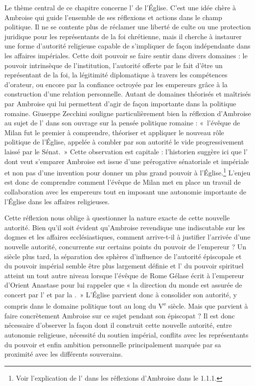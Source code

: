 Le thème central de ce chapitre concerne l' de l'Église. C'est une idée chère à Ambroise qui guide l'ensemble de ses réflexions et actions dans le champ politique. Il ne se contente plus de réclamer une liberté de culte ou une protection juridique pour les représentants de la foi chrétienne, mais il cherche à instaurer une forme d'autorité religieuse capable de s'impliquer de façon indépendante dans les affaires impériales. Cette  doit pouvoir se faire sentir dans divers domaines : le pouvoir intrinsèque de l'institution, l'autorité offerte par le fait d'être un représentant de la foi, la légitimité diplomatique à travers les compétences d'orateur, ou encore par la confiance octroyée par les empereurs grâce à la construction d'une relation personnelle. Autant de domaines théorisés et maîtrisés par Ambroise qui lui permettent d'agir de façon importante dans la politique romaine. Giuseppe Zecchini souligne particulièrement bien la réflexion d'Ambroise au sujet de l' dans son ouvrage sur la pensée politique romaine : «~l'évêque de Milan fut le premier à comprendre, théoriser et appliquer le nouveau rôle politique de l'Église, appelée à combler par son autorité le vide progressivement laissé par le Sénat.\autocite[165]{zecchini_pensiero_politico}~» Cette observation est capitale : l'historien suggère ici que l' dont veut s'emparer Ambroise est issue d'une prérogative sénatoriale et impériale et non pas d'une invention pour donner un plus grand pouvoir à l'Église.\footnote{Voir l'explication de l' dans les réflexions d'Ambroise dans le 1.1.1.} L'enjeu est donc de comprendre comment l'évêque de Milan met en place un travail de collaboration avec les empereurs tout en imposant une autonomie importante de l'Église dans les affaires religieuses.

\bigskip

Cette réflexion nous oblige à questionner la nature exacte de cette nouvelle autorité. Bien qu'il soit évident qu'Ambroise revendique une  indiscutable sur les dogmes et les affaires ecclésiastiques, comment arrive-t-il à justifier l'arrivée d'une nouvelle autorité, concurrente sur certains points du pouvoir de l'empereur ? Un siècle plus tard, la séparation des sphères d'influence de l'autorité épiscopale et du pouvoir impérial semble être plus largement définie et l' du pouvoir spirituel atteint un tout autre niveau lorsque l'évêque de Rome Gélase écrit à l'empereur d'Orient Anastase pour lui rappeler que « la direction du monde est assurée de concert par l' et par la \autocite{sassier_auctoritas}.~» L'Église parvient donc à consolider son autorité, y compris dans le domaine politique tout au long du V\textsuperscript{e} siècle. Mais que parvient à faire concrètement Ambroise sur ce sujet pendant son épiscopat ? Il est donc nécessaire d'observer la façon dont il construit cette nouvelle autorité, entre autonomie religieuse, nécessité du soutien impérial, conflits avec les représentants du pouvoir et enfin ambition personnelle principalement marquée par sa proximité avec les différents souverains.

